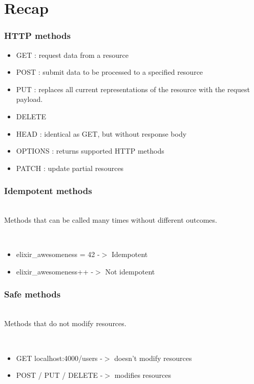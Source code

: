\section{Recap}

\frame{\tableofcontents[currentsection]}


\begin{frame}
    \frametitle{HTTP methods}

    \begin{itemize}
        \item GET : request data from a resource
        \item POST : submit data to be processed to a specified resource
        \item PUT : replaces all current representations of the resource with the request payload.
        \item DELETE
        \item HEAD : identical as GET, but without response body
        \item OPTIONS : returns supported HTTP methods
        \item PATCH : update partial resources
    \end{itemize}
\end{frame}



\begin{frame}
    \frametitle{Idempotent methods}

    \\
    Methods that can be called many times without different outcomes.

    \vfill

    \\
    \begin{itemize}
        \item elixir\_awesomeness = 42 -$>$ Idempotent
        \item elixir\_awesomeness++ -$>$ Not idempotent
    \end{itemize}
\end{frame}


\begin{frame}
    \frametitle{Safe methods}

    \\
    Methods that do not modify resources.

    \vfill

    \\
    \begin{itemize}
        \item GET localhost:4000/users -$>$ doesn't modify resources
        \item POST / PUT / DELETE -$>$ modifies resources
    \end{itemize}
\end{frame}




